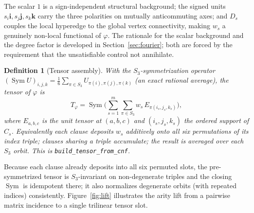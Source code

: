 \documentclass[pdflatex,sn-mathphys-num]{sn-jnl}
\theoremstyle{thmstyleone}%
\theoremstyle{thmstyletwo}%
\theoremstyle{thmstylethree}%
\newtheorem{definition}{Definition}%
\newcommand{\Sym}{\operatorname{Sym}}
\newcommand{\bi}{\mathbf{i}}
\newcommand{\bj}{\mathbf{j}}
\newcommand{\bk}{\mathbf{k}}
\newcommand{\Tphi}{T_{\varphi}}
\begin{document}
The scalar $1$ is a sign-independent structural background; the signed units
$s_i\bi,s_j\bj,s_k\bk$ carry the three polarities on mutually anticommuting
axes; and $D_s$ couples the local hyperedge to the global vertex
connectivity, making $w_s$ a genuinely non-local functional of $\varphi$.
The rationale for the scalar background and the degree factor is developed
in Section~\ref{sec:fourier}; both are forced by the requirement that the
unsatisfiable control not annihilate.

\begin{definition}[Tensor assembly]\label{def:assembly}
With the $S_3$-symmetrization operator
$(\Sym U)_{i,j,k}=\tfrac16\sum_{\pi\in S_3}U_{\pi(i),\pi(j),\pi(k)}$ (an
exact rational average), the tensor of $\varphi$ is
\[
  \Tphi=\Sym\!\Big(\sum_{s=1}^{m}\sum_{\pi\in S_3}
     w_s\,E_{\pi(i_s,j_s,k_s)}\Big),
\]
where $E_{a,b,c}$ is the unit tensor at $(a,b,c)$ and $(i_s,j_s,k_s)$ the
ordered support of $C_s$. Equivalently each clause deposits $w_s$
additively onto all six permutations of its index triple; clauses sharing a
triple accumulate; the result is averaged over each $S_3$ orbit. This is
\texttt{build\_tensor\_from\_cnf}.
\end{definition}

Because each clause already deposits into all six permuted slots, the
pre-symmetrized tensor is $S_3$-invariant on non-degenerate triples and the
closing $\Sym$ is idempotent there; it also normalizes degenerate orbits
(with repeated indices) consistently. Figure~\ref{fig:lift} illustrates the
arity lift from a pairwise matrix incidence to a single trilinear tensor
slot.
\end{document}
